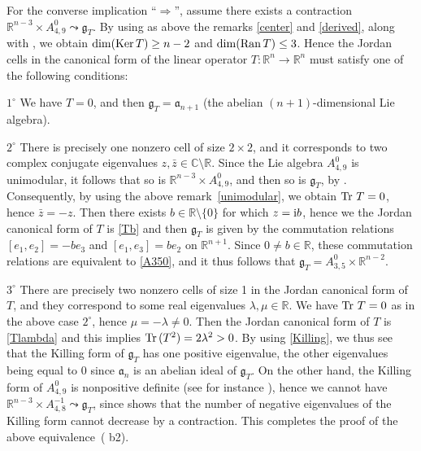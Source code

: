 \documentclass[
reqno]{amsart}
\begin{document}
\begin{itemize}
For the converse implication ``$\Rightarrow$'', assume there exists a contraction 
${{\mathbb R}}^{n-3}\times A_{4,9}^0{\leadsto}{{\mathfrak g}}_T$. 
By using as above the remarks \eqref{center} and \eqref{derived}, 
along with \cite[Th. 1((3)--(4))]{NP06}, 
we obtain $\dim({{\rm Ker}\,} T)\ge n-2$ and $\dim({{\rm Ran}\,} T)\le 3$. 
Hence the Jordan cells in the canonical form of the linear operator $T\colon{{\mathbb R}}^n\to{{\mathbb R}}^n$ 
must satisfy one of the following conditions: 

\smallbreak 

$1^\circ$ We have $T=0$, and then ${{\mathfrak g}}_T={{\mathfrak a}}_{n+1}$ (the abelian $(n+1)$-dimensional Lie algebra). 

\smallbreak 

$2^\circ$ There is precisely one nonzero cell of size $2\times 2$, and it corresponds to 
two complex conjugate eigenvalues $z,\bar z\in{{\mathbb C}}\setminus{{\mathbb R}}$.  
Since the Lie algebra $A_{4,9}^0$ is unimodular, 
it follows that so is ${{\mathbb R}}^{n-3}\times A_{4,9}^0$, 
and then so is ${{\mathfrak g}}_T$, by \cite[Th. 1(12)]{NP06}. 
Consequently, by using the above remark~\eqref{unimodular}, 
we obtain ${{\rm Tr}\,}\,T=0$, hence $\bar z=-z$. 
Then there exists $b\in{{\mathbb R}}\setminus\{0\}$ for which $z={{\rm i}} b$, hence 
we the Jordan canonical form of $T$ is \eqref{Tb} 
and then ${{\mathfrak g}}_T$ is given by the commutation relations 
$[e_1,e_2]=-b e_3$ and $[e_1,e_3]=b e_2$ on ${{\mathbb R}}^{n+1}$. 
Since $0\ne b\in{{\mathbb R}}$, these commutation relations are equivalent to \eqref{A350}, 
and it thus follows that ${{\mathfrak g}}_T=A_{3,5}^0\times {{\mathbb R}}^{n-2}$.  

\smallbreak 

$3^\circ$ There are precisely two nonzero cells of size 1 in the Jordan canonical form of $T$, 
and they correspond to some real eigenvalues $\lambda,\mu\in{{\mathbb R}}$.
We have ${{\rm Tr}\,}\,T=0$ as in the above case $2^\circ$, hence $\mu=-\lambda\ne 0$. 
Then the Jordan canonical form of $T$ is \eqref{Tlambda} 
and this implies ${{\rm Tr}\,}(T^2)=2\lambda^2>0$.
By using \eqref{Killing}, 
we thus see that the Killing form of ${{\mathfrak g}}_T$ has one positive eigenvalue, 
the other eigenvalues being equal to 0 since ${{\mathfrak a}}_n$ is an abelian ideal of ${{\mathfrak g}}_T$. 
On the other hand, the Killing form of $A_{4,9}^0$ is nonpositive definite 
(see for instance \cite[\S VI.B]{NP06}), hence we cannot have ${{\mathbb R}}^{n-3}\times A_{4,8}^{-1}{\leadsto}{{\mathfrak g}}_T$, 
since \cite[Th. 1(16)]{NP06} 
shows that the number of negative eigenvalues of the Killing form cannot decrease 
by a contraction.  
This completes the proof of the above equivalence~({{\bfseries\itshape} b2}). 
\end{itemize}
\end{document}
